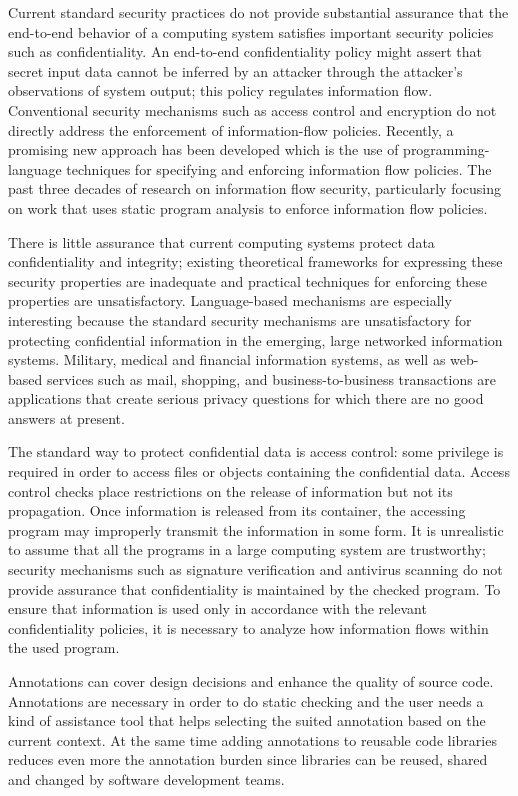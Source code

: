 Current standard security practices do not provide
substantial assurance that the end-to-end behavior of a
computing system satisfies important security policies such as
confidentiality. An end-to-end confidentiality policy might assert
that secret input data cannot be inferred by an attacker through
the attacker's observations of system output; this policy regulates
information flow.
Conventional security mechanisms such as access control
and encryption do not directly address the enforcement of
information-flow policies. Recently, a promising new approach
has been developed which is the use of programming-language techniques
for specifying and enforcing information flow policies.
The past three decades of research on
information flow security, particularly focusing on work that uses
static program analysis to enforce information flow policies. 

There is little assurance that
current computing systems protect data confidentiality and
integrity; existing theoretical frameworks for expressing these
security properties are inadequate and practical techniques for
enforcing these properties are unsatisfactory. Language-based mechanisms are especially interesting because
the standard security mechanisms are unsatisfactory
for protecting confidential information in the emerging, large
networked information systems. Military, medical and financial
information systems, as well as web-based services such
as mail, shopping, and business-to-business transactions are
applications that create serious privacy questions for which
there are no good answers at present.

The standard way to protect confidential data is access control: some privilege is required in order to
access files or objects containing the confidential data. Access
control checks place restrictions on the release of information
but not its propagation. Once information is released from
its container, the accessing program may improperly transmit the information in some form. It is
unrealistic to assume that all the programs in a large computing
system are trustworthy; security mechanisms such as signature
verification and antivirus scanning do not provide assurance
that confidentiality is maintained by the checked program. To
ensure that information is used only in accordance with the
relevant confidentiality policies, it is necessary to analyze how
information flows within the used program.

Annotations can cover design decisions and enhance the quality of source code. Annotations are necessary in order to do static checking and the user needs a kind of assistance tool that helps selecting the suited annotation based on the current context. At the same time adding annotations to reusable code libraries reduces even more the annotation burden since libraries can be reused, shared and changed by software development teams.

